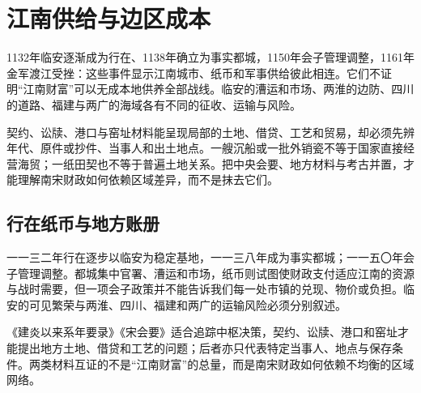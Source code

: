 \section{江南供给与边区成本}

1132年临安逐渐成为行在、1138年确立为事实都城，1150年会子管理调整，1161年金军渡江受挫：这些事件显示江南城市、纸币和军事供给彼此相连。它们不证明“江南财富”可以无成本地供养全部战线。临安的漕运和市场、两淮的边防、四川的道路、福建与两广的海域各有不同的征收、运输与风险。

契约、讼牍、港口与窑址材料能呈现局部的土地、借贷、工艺和贸易，却必须先辨年代、原件或抄件、当事人和出土地点。一艘沉船或一批外销瓷不等于国家直接经营海贸；一纸田契也不等于普遍土地关系。把中央会要、地方材料与考古并置，才能理解南宋财政如何依赖区域差异，而不是抹去它们。

\subsection{行在纸币与地方账册}

一一三二年行在逐步以临安为稳定基地，一一三八年成为事实都城；一一五〇年会子管理调整。都城集中官署、漕运和市场，纸币则试图使财政支付适应江南的资源与战时需要，但一项会子政策并不能告诉我们每一处市镇的兑现、物价或负担。临安的可见繁荣与两淮、四川、福建和两广的运输风险必须分别叙述。

《建炎以来系年要录》《宋会要》适合追踪中枢决策，契约、讼牍、港口和窑址才能提出地方土地、借贷和工艺的问题；后者亦只代表特定当事人、地点与保存条件。两类材料互证的不是“江南财富”的总量，而是南宋财政如何依赖不均衡的区域网络。
